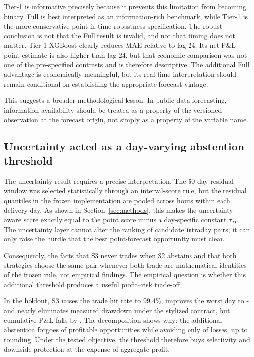 Tier-1 is informative precisely because it prevents this limitation from becoming binary. Full is best interpreted as an information-rich benchmark, while Tier-1 is the more conservative point-in-time robustness specification. The robust conclusion is not that the Full result is invalid, and not that timing does not matter. Tier-1 XGBoost clearly reduces MAE relative to lag-24. Its net P\&L point estimate is also higher than lag-24, but that economic comparison was not one of the pre-specified contrasts and is therefore descriptive. The additional Full advantage is economically meaningful, but its real-time interpretation should remain conditional on establishing the appropriate forecast vintage.

This suggests a broader methodological lesson. In public-data forecasting, information availability should be treated as a property of the versioned observation at the forecast origin, not simply as a property of the variable name.

\subsection{Uncertainty acted as a day-varying abstention threshold}

The uncertainty result requires a precise interpretation. The 60-day residual window was selected statistically through an interval-score rule, but the residual quantiles in the frozen implementation are pooled across hours within each delivery day. As shown in Section~\ref{sec:methods}, this makes the uncertainty-aware score exactly equal to the point score minus a day-specific constant \(\tau_D\). The uncertainty layer cannot alter the ranking of candidate intraday pairs; it can only raise the hurdle that the best point-forecast opportunity must clear.

Consequently, the facts that S3 never trades when S2 abstains and that both strategies choose the same pair whenever both trade are mathematical identities of the frozen rule, not empirical findings. The empirical question is whether this additional threshold produces a useful profit--risk trade-off.

In the holdout, S3 raises the trade hit rate to 99.4\%, improves the worst day to - and nearly eliminates measured drawdown under the stylized contract, but cumulative P\&L falls by . The decomposition shows why: the additional abstention forgoes  of profitable opportunities while avoiding only  of losses, up to rounding. Under the tested objective, the threshold therefore buys selectivity and downside protection at the expense of aggregate profit.

